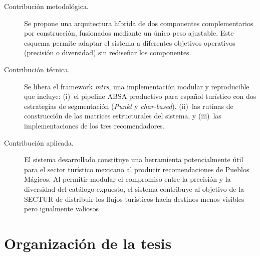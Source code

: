\begin{description}
	\item[Contribución metodológica.] Se propone una arquitectura híbrida de dos componentes complementarios por construcción, fusionados mediante un único peso ajustable. Este esquema permite adaptar el sistema a diferentes objetivos operativos (precisión o diversidad) sin rediseñar los componentes.

	\item[Contribución técnica.] Se libera el framework \textit{mtrs}, una implementación modular y reproducible que incluye: (i)~el pipeline ABSA productivo para español turístico con dos estrategias de segmentación (\textit{Punkt} y \textit{char-based}), (ii)~las rutinas de construcción de las matrices estructurales del sistema, y (iii)~las implementaciones de los tres recomendadores.

	\item[Contribución aplicada.] El sistema desarrollado constituye una herramienta potencialmente útil para el sector turístico mexicano al producir recomendaciones de Pueblos Mágicos. Al permitir modular el compromiso entre la precisión y la diversidad del catálogo expuesto, el sistema contribuye al objetivo de la SECTUR de distribuir los flujos turísticos hacia destinos menos visibles pero igualmente valiosos \citep{TurismoPIB_2024}.
\end{description}

\section{Organización de la tesis}
